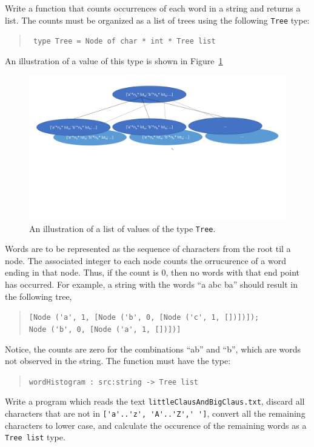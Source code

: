 \label{wordHistogram}
Write a function that counts occurrences of each word in a string and
returns a list. The counts must be organized as a list of trees using the
following \lstinline{Tree} type:
\begin{quote}
  \mbox{\lstinline! type Tree = Node of char * int * Tree list!}
\end{quote}
An illustration of a value of this type is shown in Figure~\ref{fig:treeType}
\begin{figure}
  \centering
  \includegraphics[width=\textwidth]{treeType}
  \caption{An illustration of a list of values of the type \lstinline{Tree}.}
  \label{fig:treeType}
\end{figure}
Words are to be represented as the sequence of characters from the
root til a node. The associated integer to each node counts the
orrucurence of a word ending in that node. Thus, if the count is 0, then
no words with that end point has occurred. For example, a string with the
words ``a abc ba'' should result in the following tree,
\begin{quote}
  \mbox{\lstinline![Node ('a', 1, [Node ('b', 0, [Node ('c', 1, [])])]);!}\\
  \mbox{\hspace{0.5em}\lstinline!Node ('b', 0, [Node ('a', 1, [])])]!}
\end{quote}
Notice, the counts are zero for the combinations ``ab'' and ``b'',
which are words not observed in the string. The function must have the type:
\begin{quote}
  \mbox{\lstinline!wordHistogram : src:string -> Tree list!}
\end{quote}
Write a program which reads the text \lstinline[language=console]{littleClausAndBigClaus.txt}, discard all characters that are not in \lstinline{['a'..'z', 'A'..'Z',' ']}, convert all the remaining characters to lower case, and calculate the occurence of the remaining words as a \lstinline{Tree list} type.
